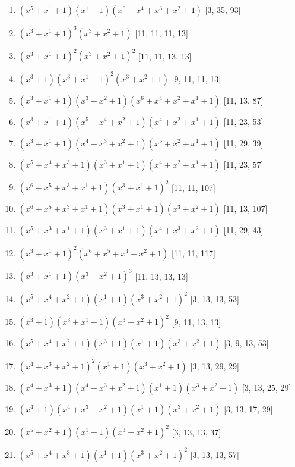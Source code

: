 \documentclass[10pt,twocolumn]{article}
\begin{document}
\begin{enumerate}
\item $(x^{5} + x^{1} + 1)(x^{1} + 1)(x^{6} + x^{4} + x^{3} + x^{2} + 1)$  [3, 35, 93]
\item $(x^{3} + x^{1} + 1)^{3}(x^{3} + x^{2} + 1)$  [11, 11, 11, 13]
\item $(x^{3} + x^{1} + 1)^{2}(x^{3} + x^{2} + 1)^{2}$  [11, 11, 13, 13]
\item $(x^{3} + 1)(x^{3} + x^{1} + 1)^{2}(x^{3} + x^{2} + 1)$  [9, 11, 11, 13]
\item $(x^{3} + x^{1} + 1)(x^{3} + x^{2} + 1)(x^{6} + x^{4} + x^{2} + x^{1} + 1)$  [11, 13, 87]
\item $(x^{3} + x^{1} + 1)(x^{5} + x^{4} + x^{2} + 1)(x^{4} + x^{2} + x^{1} + 1)$  [11, 23, 53]
\item $(x^{3} + x^{1} + 1)(x^{4} + x^{3} + x^{2} + 1)(x^{5} + x^{2} + x^{1} + 1)$  [11, 29, 39]
\item $(x^{5} + x^{4} + x^{3} + 1)(x^{3} + x^{1} + 1)(x^{4} + x^{2} + x^{1} + 1)$  [11, 23, 57]
\item $(x^{6} + x^{5} + x^{3} + x^{1} + 1)(x^{3} + x^{1} + 1)^{2}$  [11, 11, 107]
\item $(x^{6} + x^{5} + x^{3} + x^{1} + 1)(x^{3} + x^{1} + 1)(x^{3} + x^{2} + 1)$  [11, 13, 107]
\item $(x^{5} + x^{3} + x^{1} + 1)(x^{3} + x^{1} + 1)(x^{4} + x^{3} + x^{2} + 1)$  [11, 29, 43]
\item $(x^{3} + x^{1} + 1)^{2}(x^{6} + x^{5} + x^{4} + x^{2} + 1)$  [11, 11, 117]
\item $(x^{3} + x^{1} + 1)(x^{3} + x^{2} + 1)^{3}$  [11, 13, 13, 13]
\item $(x^{5} + x^{4} + x^{2} + 1)(x^{1} + 1)(x^{3} + x^{2} + 1)^{2}$  [3, 13, 13, 53]
\item $(x^{3} + 1)(x^{3} + x^{1} + 1)(x^{3} + x^{2} + 1)^{2}$  [9, 11, 13, 13]
\item $(x^{5} + x^{4} + x^{2} + 1)(x^{3} + 1)(x^{1} + 1)(x^{3} + x^{2} + 1)$  [3, 9, 13, 53]
\item $(x^{4} + x^{3} + x^{2} + 1)^{2}(x^{1} + 1)(x^{3} + x^{2} + 1)$  [3, 13, 29, 29]
\item $(x^{4} + x^{3} + 1)(x^{4} + x^{3} + x^{2} + 1)(x^{1} + 1)(x^{3} + x^{2} + 1)$  [3, 13, 25, 29]
\item $(x^{4} + 1)(x^{4} + x^{3} + x^{2} + 1)(x^{1} + 1)(x^{3} + x^{2} + 1)$  [3, 13, 17, 29]
\item $(x^{5} + x^{2} + 1)(x^{1} + 1)(x^{3} + x^{2} + 1)^{2}$  [3, 13, 13, 37]
\item $(x^{5} + x^{4} + x^{3} + 1)(x^{1} + 1)(x^{3} + x^{2} + 1)^{2}$  [3, 13, 13, 57]

\end{enumerate}
\end{document}
